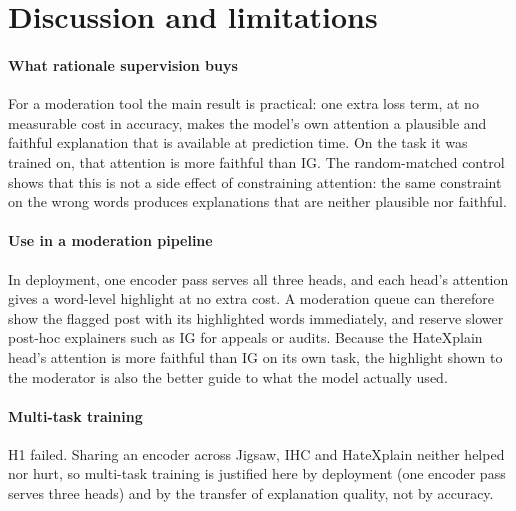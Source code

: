 \documentclass[preprint,12pt,authoryear]{elsarticle}
\begin{document}
\section{Discussion and limitations}
\label{sec:discussion}

\paragraph{What rationale supervision buys}
For a moderation tool the main result is practical: one extra loss term, at no measurable cost in accuracy, makes the model's own attention a plausible and faithful explanation that is available at prediction time. On the task it was trained on, that attention is more faithful than IG. The random-matched control shows that this is not a side effect of constraining attention: the same constraint on the wrong words produces explanations that are neither plausible nor faithful.

\paragraph{Use in a moderation pipeline}
In deployment, one encoder pass serves all three heads, and each head's attention gives a word-level highlight at no extra cost. A moderation queue can therefore show the flagged post with its highlighted words immediately, and reserve slower post-hoc explainers such as IG for appeals or audits. Because the HateXplain head's attention is more faithful than IG on its own task, the highlight shown to the moderator is also the better guide to what the model actually used.

\paragraph{Multi-task training}
H1 failed. Sharing an encoder across Jigsaw, IHC and HateXplain neither helped nor hurt, so multi-task training is justified here by deployment (one encoder pass serves three heads) and by the transfer of explanation quality, not by accuracy.
\end{document}
